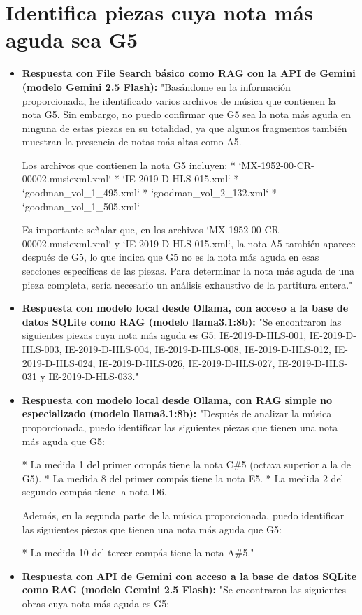 \section{Identifica piezas cuya nota más aguda sea G5}
\begin{itemize}
    \item \textbf{Respuesta con File Search básico como RAG con la API de Gemini (modelo Gemini 2.5 Flash):} "Basándome en la información proporcionada, he identificado varios archivos de música que contienen la nota G5. Sin embargo, no puedo confirmar que G5 sea la nota más aguda en ninguna de estas piezas en su totalidad, ya que algunos fragmentos también muestran la presencia de notas más altas como A5.

Los archivos que contienen la nota G5 incluyen:
*   `MX-1952-00-CR-00002.musicxml.xml`
*   `IE-2019-D-HLS-015.xml`
*   `goodman\_vol\_1\_495.xml`
*   `goodman\_vol\_2\_132.xml`
*   `goodman\_vol\_1\_505.xml`

Es importante señalar que, en los archivos `MX-1952-00-CR-00002.musicxml.xml` y `IE-2019-D-HLS-015.xml`, la nota A5 también aparece después de G5, lo que indica que G5 no es la nota más aguda en esas secciones específicas de las piezas. Para determinar la nota más aguda de una pieza completa, sería necesario un análisis exhaustivo de la partitura entera."
    \item \textbf{Respuesta con modelo local desde Ollama, con acceso a la base de datos SQLite como RAG (modelo llama3.1:8b):} "Se encontraron las siguientes piezas cuya nota más aguda es G5: IE-2019-D-HLS-001, IE-2019-D-HLS-003, IE-2019-D-HLS-004, IE-2019-D-HLS-008, IE-2019-D-HLS-012, IE-2019-D-HLS-024, IE-2019-D-HLS-026, IE-2019-D-HLS-027, IE-2019-D-HLS-031 y IE-2019-D-HLS-033."
    \item \textbf{Respuesta con modelo local desde Ollama, con RAG simple no especializado (modelo llama3.1:8b):} "Después de analizar la música proporcionada, puedo identificar las siguientes piezas que tienen una nota más aguda que G5:

* La medida 1 del primer compás tiene la nota C\#5 (octava superior a la de G5).
* La medida 8 del primer compás tiene la nota E5.
* La medida 2 del segundo compás tiene la nota D6.

Además, en la segunda parte de la música proporcionada, puedo identificar las siguientes piezas que tienen una nota más aguda que G5:

* La medida 10 del tercer compás tiene la nota A\#5."
    \item \textbf{Respuesta con API de Gemini con acceso a la base de datos SQLite como RAG (modelo Gemini 2.5 Flash):} "Se encontraron las siguientes obras cuya nota más aguda es G5:


\end{itemize}
